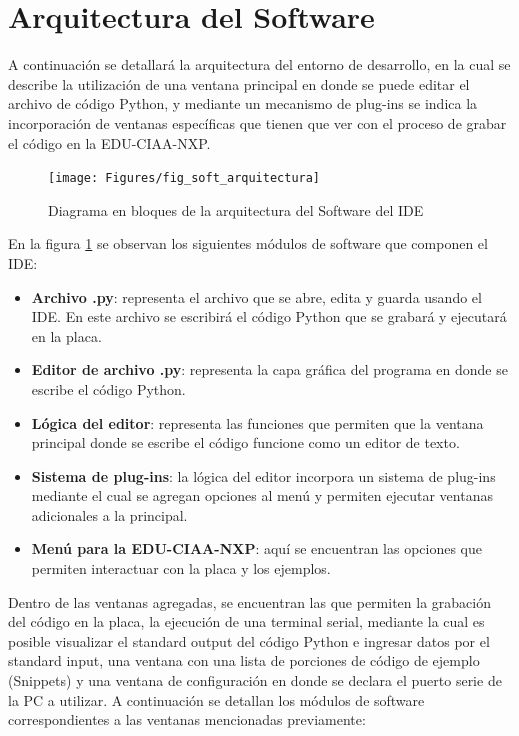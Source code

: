 
\section{Arquitectura del Software}
\label{sec:softwareArq}

A continuación se detallará la arquitectura del entorno de desarrollo, en la cual se describe la utilización de una ventana principal en donde se puede editar el archivo de código Python, y mediante un mecanismo de plug-ins se indica la incorporación de ventanas específicas que tienen que ver con el proceso de grabar el código en la EDU-CIAA-NXP. 

\begin{figure}[ht]
  \centering
    \texttt{[image: Figures/fig\_soft\_arquitectura]}
  \caption{Diagrama en bloques de la arquitectura del Software del IDE}
  \label{fig:softwareArq}
\end{figure}

En la figura \ref{fig:softwareArq} se observan los siguientes módulos de software que componen el IDE:

\begin{itemize}
	\item \textbf{Archivo .py}: representa el archivo que se abre, edita y guarda usando el IDE. En este archivo se escribirá el código Python que se grabará y ejecutará en la placa.
	\item \textbf{Editor de archivo .py}: representa la capa gráfica del programa en donde se escribe el código Python.
	\item \textbf{Lógica del editor}: representa las funciones que permiten que la ventana principal donde se escribe el código funcione como un editor de texto.
	\item \textbf{Sistema de plug-ins}: la lógica del editor incorpora un sistema de plug-ins mediante el cual se agregan opciones al menú y permiten ejecutar ventanas adicionales a la principal.
	\item \textbf{Menú para la EDU-CIAA-NXP}: aquí se encuentran las opciones que permiten interactuar con la placa y los ejemplos.
\end{itemize}

Dentro de las ventanas agregadas, se encuentran las que permiten la grabación del código en la placa, la ejecución de una terminal serial, mediante la cual es posible visualizar el standard output del código Python e ingresar datos por el standard input, una ventana con una lista de porciones de código de ejemplo (Snippets) y una ventana de configuración en donde se declara el puerto serie de la PC a utilizar.
A continuación se detallan los módulos de software correspondientes a las ventanas mencionadas previamente:

